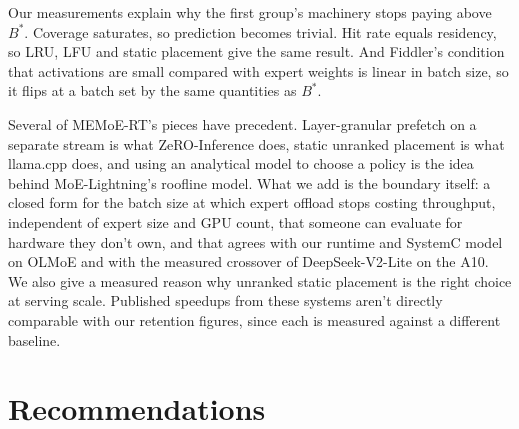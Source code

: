 \documentclass[10pt,a4paper]{article}
\begin{document}
Our measurements explain why the first group's machinery stops paying above
$B^{*}$. Coverage saturates, so prediction becomes trivial. Hit rate equals
residency, so LRU, LFU and static placement give the same result. And Fiddler's
condition that activations are small compared with expert weights is linear in
batch size, so it flips at a batch set by the same quantities as $B^{*}$.

Several of MEMoE-RT's pieces have precedent. Layer-granular prefetch on a separate
stream is what ZeRO-Inference does, static unranked placement is what llama.cpp
does, and using an analytical model to choose a policy is the idea behind
MoE-Lightning's roofline model. What we add is the boundary itself: a closed form
for the batch size at which expert offload stops costing throughput, independent
of expert size and GPU count, that someone can evaluate for hardware they don't
own, and that agrees with our runtime and SystemC model on OLMoE and with the
measured crossover of DeepSeek-V2-Lite on the A10. We also give a
measured reason why unranked static placement is the right choice at serving
scale. Published speedups from these systems aren't directly comparable with our
retention figures, since each is measured against a different baseline.

\section{Recommendations}
\label{sec:recommendations}
\end{document}
